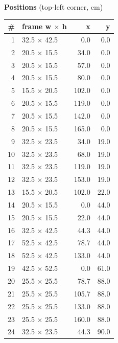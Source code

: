 \documentclass[a4paper,landscape,10pt]{article}
\begin{document}
\begin{minipage}[t]{0.25\textwidth}
\vspace{8pt}
{\bfseries Positions} (top-left corner, cm)\\[2pt]
\tiny
\begin{tabular}{@{}r l r r@{}}
\toprule
\# & frame w $\times$ h & x & y \\
\midrule
1 & 32.5 $\times$ 42.5 & 0.0 & 0.0 \\
2 & 20.5 $\times$ 15.5 & 34.0 & 0.0 \\
3 & 20.5 $\times$ 15.5 & 57.0 & 0.0 \\
4 & 20.5 $\times$ 15.5 & 80.0 & 0.0 \\
5 & 15.5 $\times$ 20.5 & 102.0 & 0.0 \\
6 & 20.5 $\times$ 15.5 & 119.0 & 0.0 \\
7 & 20.5 $\times$ 15.5 & 142.0 & 0.0 \\
8 & 20.5 $\times$ 15.5 & 165.0 & 0.0 \\
9 & 32.5 $\times$ 23.5 & 34.0 & 19.0 \\
10 & 32.5 $\times$ 23.5 & 68.0 & 19.0 \\
11 & 32.5 $\times$ 23.5 & 119.0 & 19.0 \\
12 & 32.5 $\times$ 23.5 & 153.0 & 19.0 \\
13 & 15.5 $\times$ 20.5 & 102.0 & 22.0 \\
14 & 20.5 $\times$ 15.5 & 0.0 & 44.0 \\
15 & 20.5 $\times$ 15.5 & 22.0 & 44.0 \\
16 & 32.5 $\times$ 42.5 & 44.3 & 44.0 \\
17 & 52.5 $\times$ 42.5 & 78.7 & 44.0 \\
18 & 52.5 $\times$ 42.5 & 133.0 & 44.0 \\
19 & 42.5 $\times$ 52.5 & 0.0 & 61.0 \\
20 & 25.5 $\times$ 25.5 & 78.7 & 88.0 \\
21 & 25.5 $\times$ 25.5 & 105.7 & 88.0 \\
22 & 25.5 $\times$ 25.5 & 133.0 & 88.0 \\
23 & 25.5 $\times$ 25.5 & 160.0 & 88.0 \\
24 & 32.5 $\times$ 23.5 & 44.3 & 90.0 \\
\bottomrule
\end{tabular}
\end{minipage}
\clearpage
\end{document}
